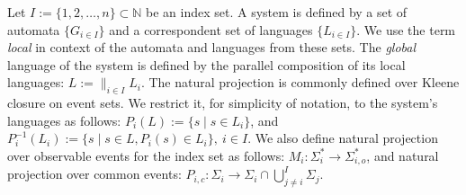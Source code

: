 \documentclass[a4paper, 10pt, conference]{ieeeconf}
\begin{document}
Let $I := \{1,2,\ldots,n\} \subset  \mathbb{N}$ be an index set. A system is
defined by a set of automata $\{G_{i \in I}\}$ and a correspondent set of
languages $\{L_{i \in I}\}$. We use the term \emph{local} in context of the
automata and languages from these sets. The \emph{global} language of the system
is defined by the parallel composition \cite{cassandras_introduction_2010} of
its local languages:
$L := \parallel_{i \in I} L_i$.
The natural projection is commonly defined over Kleene closure on event sets.
We restrict it, for simplicity of notation, to the system's languages as
follows: $P_i(L) := \{s\mid s\in L_{i}\}$, and 
$P_i^{-1}(L_{i}) := \{s \mid s \in L, P_i(s) \in L_i\}, ~i \in I$.
We also define natural projection over observable events for the index set as
follows: $M_i :\Sigma_i^* \rightarrow \Sigma_{i,o}^*$, and 
natural projection over common events: 
$P_{i,c} : \Sigma_i \rightarrow \Sigma_i \cap \bigcup_{j\neq i}^I\Sigma_j$.


% 
% 
\end{document}
